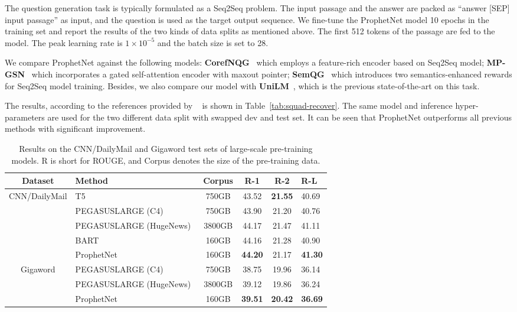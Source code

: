 \documentclass[11pt,a4paper]{article}
\begin{document}
The question generation task is typically formulated as a Seq2Seq problem. 
The input passage and the answer are packed as ``answer [SEP] input passage'' as input, and the question is used as the target output sequence.
We fine-tune the ProphetNet model 10 epochs in the training set and report the results of the two kinds of data splits as mentioned above. 
The first 512 tokens of the passage are fed to the model. 
The peak learning rate is $1 \times 10^{-5}$ and the batch size is set to 28.

We compare ProphetNet against the following models: \textbf{CorefNQG}~\cite{du2018harvesting} which employs a feature-rich encoder based on Seq2Seq model; \textbf{MP-GSN}~\cite{zhao2018paragraph} which incorporates a gated self-attention encoder with maxout pointer; \textbf{SemQG}~\cite{zhang2019addressing} which introduces two semantics-enhanced rewards for Seq2Seq model training.
Besides, we also compare our model with \textbf{UniLM}~\cite{dong2019unified}, which is the previous state-of-the-art on this task.


The results, according to the references provided by ~\citet{du2017learning} is shown in Table~\ref{tab:squad-recover}. The same model and inference hyper-parameters are used for the two different data split with swapped dev and test set. It can be seen that ProphetNet outperforms all previous methods with significant improvement. 

\begin{table*}[htbp] 
\small
\begin{center}
\begin{tabular}{clcccl}
\toprule
Dataset & Method & Corpus & R-1 & R-2 & R-L\\
 \midrule
 \multirow{5}{*}{CNN/DailyMail}
  & T5~\cite{raffel2019exploring} & 750GB &  43.52  & \textbf{21.55} & 40.69\\
 & PEGASUSLARGE (C4)~\cite{zhang2019pegasus} & 750GB & 43.90 & 21.20 & 40.76\\
 & PEGASUSLARGE (HugeNews)~\cite{zhang2019pegasus} & 3800GB & 44.17 &21.47 &41.11\\
 & BART~\cite{lewis2019bart}& 160GB  & 44.16 & 21.28 & 40.90\\
 &ProphetNet & 160GB & \textbf{44.20} & 21.17 & \textbf{41.30}\\
 \midrule
 \multirow{3}{*}{Gigaword} & PEGASUSLARGE (C4)~\cite{zhang2019pegasus} & 750GB &   38.75  & 19.96   & 36.14\\
 &PEGASUSLARGE (HugeNews)~\cite{zhang2019pegasus} & 3800GB & 39.12  & 19.86   & 36.24\\
  &ProphetNet & 160GB & \textbf{39.51} & \textbf{20.42} & \textbf{36.69}\\ 
 \bottomrule
\end{tabular}
\end{center}
\caption{Results on the CNN/DailyMail and Gigaword test sets of large-scale pre-training models. R is short for ROUGE, and Corpus denotes the size of the pre-training data.}\label{tab:large} 
\end{table*}
\end{document}
